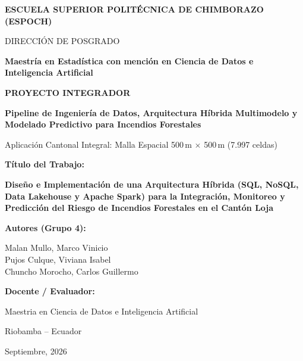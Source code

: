 \documentclass[11pt,a4paper]{article}
\begin{document}
\begin{titlepage}
\centering
\vspace*{0.5cm}

{\large \textbf{ESCUELA SUPERIOR POLIT\'ECNICA DE CHIMBORAZO (ESPOCH)}\par}
\vspace{0.2cm}
{\large DIRECCI\'ON DE POSGRADO\par}
\vspace{0.2cm}
{\large \textbf{Maestr\'ia en Estad\'istica con menci\'on en Ciencia de Datos e Inteligencia Artificial}\par}

\vspace{1.8cm}
{\Huge\bfseries\color{myNewColorA} PROYECTO INTEGRADOR\par}
\vspace{0.4cm}
{\Large\bfseries\color{myNewColorB} Pipeline de Ingenier\'ia de Datos, Arquitectura H\'ibrida Multimodelo y Modelado Predictivo para Incendios Forestales\par}
\vspace{0.3cm}
{\large Aplicaci\'on Cantonal Integral: Malla Espacial 500\,m $\times$ 500\,m (7.997 celdas)\par}

\vspace{1.5cm}
\begin{minipage}{0.9\textwidth}
\centering
{\large\bfseries T\'itulo del Trabajo:\par}
\vspace{0.2cm}
{\Large\bfseries Dise\~no e Implementaci\'on de una Arquitectura H\'ibrida (SQL, NoSQL, Data Lakehouse y Apache Spark) para la Integraci\'on, Monitoreo y Predicci\'on del Riesgo de Incendios Forestales en el Cant\'on Loja\par}
\end{minipage}

\vspace{1.8cm}
{\large\bfseries Autores (Grupo 4):\par}
\vspace{0.3cm}
{\large
Malan Mullo, Marco Vinicio \\
Pujos Culque, Viviana Isabel \\
Chuncho Morocho, Carlos Guillermo \par}

\vspace{1.8cm}
{\large\bfseries Docente / Evaluador:\par}
\vspace{0.2cm}
{\large Maestria en Ciencia de Datos e Inteligencia Artificial\par}

\vspace{1.5cm}
{\large Riobamba -- Ecuador\par}
{\large Septiembre, 2026\par}

\vfill
\end{titlepage}
\end{document}
